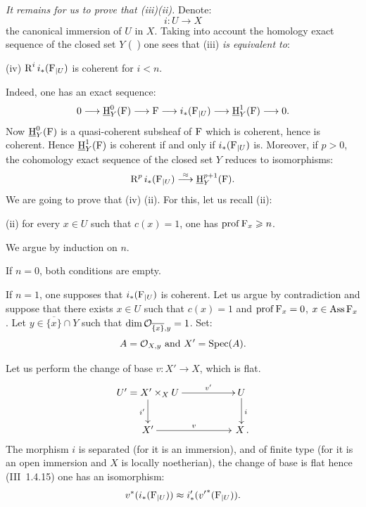 \emph{It remains for us to prove that \textup{(iii)}\ALORS\textup{(ii)}.} Denote:
\[i\colon U\to X\]
the canonical immersion of $U$ in $X$. Taking into account the homology exact sequence of the closed set $Y$ (~) one sees that (iii) \emph{is equivalent to}:

(iv) $\operatorname{R}^ii_\ast({\operatorname{F}}_{|U})$ is coherent for $i<n$. \label{condition}

\noindent Indeed, one has an exact sequence:
\[0\to \SheafH^0_Y({\Fa})\to {\Fa} \to i_\ast({\Fa}_{|U})\to \SheafH^1_Y({\Fa}) \to 0.
\]
Now $\operatorname{\underline{H}}^0_Y({\operatorname{F}})$ is a quasi-coherent subsheaf of ${\operatorname{F}}$ which is coherent, hence is coherent. Hence $\operatorname{\underline{H}}^1_Y({\operatorname{F}})$ is coherent if and only if $i_\ast({\operatorname{F}}_{|U})$ is. Moreover, if $p>0$, the cohomology exact sequence of the closed set $Y$ reduces to isomorphisms:
\[
\R^pi_\ast({\Fa}_{|U})\overset{\approx}{\to}\SheafH^{p+1}_Y({\Fa}).
\]
We are going to prove that (iv) \ALORS (ii). For this, let us recall (ii):

(ii) for every $x\in U$ such that $c(x)=1$, one has $\operatorname{prof} {\operatorname{F}}_x\geqslant n$.

We argue by induction on $n$.

If $n=0$, both conditions are empty.

If $n=1$, one supposes that $i_\ast({\operatorname{F}}_{|U})$ is coherent. Let us argue by contradiction and suppose that there exists $x\in U$ such that $c(x)=1$ and $\operatorname{prof} {\operatorname{F}}_x=0$, \ie $x\in \operatorname{Ass} {\operatorname{F}}_x$. Let $y\in\overline{\{x\}}\cap Y$ such that $\dim {\mathcal O}_{\overline{\{x\}}, y}=1$. Set:
\[A={\mathcal O}_{X, y}\text{ and } X'=\operatorname{Spec}(A).
\]

\setcounter{equation}{6}

Let us perform the change of base $v\colon X'\to X$, which is flat.
\begin{equation} \label{eq:VIII.2.7}
\begin{array}{c}
\xymatrix@C=5em{ U'=X'\times_X U\ar[r]^-{v'}\ar[d]_{i'} & U\ar[d]^i \\
X'\ar[r]^-v & \,X\,.
}
\end{array}
\end{equation}
The morphism $i$ is separated (for it is an immersion), and of finite type (for it is an open immersion and $X$ is locally noetherian), the change of base is flat hence (\EGA III~1.4.15) one has an isomorphism:
\begin{equation} \label{eq:VIII.2.8}
v^\ast(i_\ast({\operatorname{F}}_{|U})) \approx i'_\ast({v'}^\ast({\operatorname{F}}_{|U})).
\end{equation}

